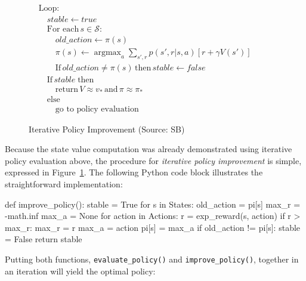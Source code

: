 \begin{figure}
\begin{tcolorbox}[colback=code]
\small
\vspace{-\baselineskip}
\begin{align*}
&\text{Loop:} \\
&\quad stable \leftarrow true \\
&\quad \text{For each}\, s \in \mathcal{S}: \\
&\quad \quad old\_action \leftarrow \pi(s) \\
&\quad \quad \pi (s) \leftarrow \operatorname*{argmax}\nolimits_a \sum\nolimits_{s', r} p(s', r|s, a) [r + \gamma V(s')] \hspace{1in} \\
&\quad \quad \text{If}\, old\_action \neq \pi(s) \, \text{then} \, stable \leftarrow false \\
&\quad \text{If}\, stable \; \text{then} \\
&\quad \quad \text{return}\, V \approx v_*\, \text{and} \, \pi \approx \pi_* \\
&\quad \text{else} \\
&\quad \quad \text{go to policy evaluation}
\end{align*}
\end{tcolorbox}
\caption{Iterative Policy Improvement (Source: SB)}
\label{fig:policyimprovement}
\end{figure}

Because the state value computation was already demonstrated using iterative policy evaluation above, the procedure for \emph{iterative policy improvement} is simple, expressed in Figure~\ref{fig:policyimprovement}. The following Python code block illustrates the straightforward implementation:

\begin{samepage}
\begin{pythoncode}
def improve_policy():
    stable = True
    for s in States:
        old_action = pi[s]
        max_r = -math.inf
        max_a = None
        for action in Actions:
            r = exp_reward(s, action)
            if r > max_r:
                max_r = r
                max_a = action
        pi[s] = max_a
        if old_action != pi[s]:
            stable = False
    return stable
\end{pythoncode}
\end{samepage}

Putting both functions, \texttt{evaluate\_policy()} and \texttt{improve\_policy()}, together in an iteration will yield the optimal policy:


